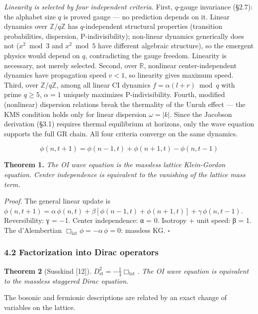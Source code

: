 \documentclass[
]{article}
\begin{document}
\emph{Linearity is selected by four independent criteria.} First,
\(q\)-gauge invariance (§2.7): the alphabet size \(q\) is proved gauge
--- no prediction depends on it. Linear dynamics over
\(\mathbb{Z}/q\mathbb{Z}\) has \(q\)-independent structural properties
(transition probabilities, dispersion, P-indivisibility); non-linear
dynamics generically does not (\(x^2 \bmod 3\) and \(x^2 \bmod 5\) have
different algebraic structure), so the emergent physics would depend on
\(q\), contradicting the gauge freedom. Linearity is necessary, not
merely selected. Second, over \(\mathbb{R}\), nonlinear
center-independent dynamics have propagation speed \(v < 1\), so
linearity gives maximum speed. Third, over \(\mathbb{Z}/q\mathbb{Z}\),
among all linear CI dynamics \(f = \alpha(l + r) \bmod q\) with prime
\(q \geq 5\), \(\alpha = 1\) uniquely maximizes P-indivisibility.
Fourth, modified (nonlinear) dispersion relations break the thermality
of the Unruh effect --- the KMS condition holds only for linear
dispersion \(\omega = |k|\). Since the Jacobson derivation (§3.1)
requires thermal equilibrium at horizons, only the wave equation
supports the full GR chain. All four criteria converge on the same
dynamics.

\[\phi(n, t+1) = \phi(n-1, t) + \phi(n+1, t) - \phi(n, t-1)\]

\textbf{Theorem 1.} \emph{The OI wave equation is the massless lattice
Klein-Gordon equation. Center independence is equivalent to the
vanishing of the lattice mass term.}

\emph{Proof.} The general linear update is
\(\phi(n, t+1) = \alpha\,\phi(n,t) + \beta[\phi(n-1,t) + \phi(n+1,t)] + \gamma\,\phi(n,t-1)\).
Reversibility: γ = −1. Center independence: α = 0. Isotropy + unit
speed: β = 1. The d'Alembertian
\(\Box_{\text{lat}}\phi = -\alpha\,\phi = 0\): massless KG. \(\square\)

\hypertarget{factorization-into-dirac-operators}{%
\subsubsection{4.2 Factorization into Dirac
operators}\label{factorization-into-dirac-operators}}

\textbf{Theorem 2} (Susskind {[}12{]}).
\emph{\(D_{\text{st}}^2 = -\frac{1}{4}\Box_{\text{lat}}\). The OI wave
equation is equivalent to the massless staggered Dirac equation.}

The bosonic and fermionic descriptions are related by an exact change of
variables on the lattice.
\end{document}
